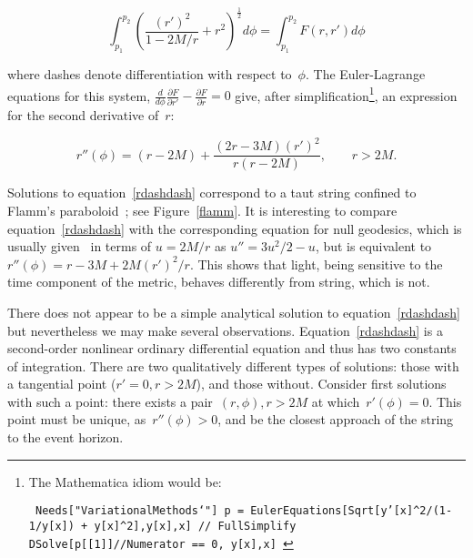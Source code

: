 \documentclass[review]{elsarticle}
\begin{document}

\begin{equation}
  \int_{p_1}^{p_2}\left(\frac{\left(r'\right)^2}{1-2M/r} + r^2\right)^\frac{1}{2}d\phi=
  \int_{p_1}^{p_2}F\left(r,r'\right)d\phi
\end{equation}

\noindent where dashes denote differentiation with respect to~$\phi$.  The
Euler-Lagrange equations for this system,
$\frac{d}{d\phi}\frac{\partial F}{\partial r'}-\frac{\partial
  F}{\partial r}=0$ give, after simplification\footnote{The Mathematica
  idiom would be:

\noindent
{\tt
Needs["VariationalMethods`"]\\
p = EulerEquations[Sqrt[y'[x]\^{}2/(1-1/y[x]) + y[x]\^{}2],y[x],x] // FullSimplify\\
DSolve[p[[1]]//Numerator == 0, y[x],x]
}}, an expression for the second derivative of~$r$:

\begin{equation}\label{rdashdash}
  r''\left(\phi\right) =
  (r-2M) + \frac{(2r-3M)\left(r'\right)^2}{r\left(r-2M\right)},\qquad r>2M.
\end{equation}

\noindent 
Solutions to equation~\ref{rdashdash} correspond to a taut string
confined to Flamm's paraboloid~\cite{flamm1916}; see
Figure~\ref{flamm}.  It is interesting to compare
equation~\ref{rdashdash} with the corresponding equation for null
geodesics, which is usually given~\cite{wald} in terms of $u=2M/r$ as
$u''=3u^2/2-u$, but is equivalent
to~$r''\left(\phi\right)=r-3M+2M\left(r'\right)^2/r$.  This shows that
light, being sensitive to the time component of the metric, behaves
differently from string, which is not.

There does not appear to be a simple analytical solution to
equation~\ref{rdashdash} but nevertheless we may make several
observations.  Equation~\ref{rdashdash} is a second-order nonlinear
ordinary differential equation and thus has two constants of
integration.  There are two qualitatively different types of
solutions: those with a tangential point ($r'=0,r>2M$), and those
without.  Consider first solutions with such a point: there exists a
pair~$\left(r,\phi\right), r>2M$ at which~$r'(\phi)=0$.  This point
must be unique, as~$r''(\phi)>0$, and be the closest approach of the
string to the event horizon.
\end{document}

